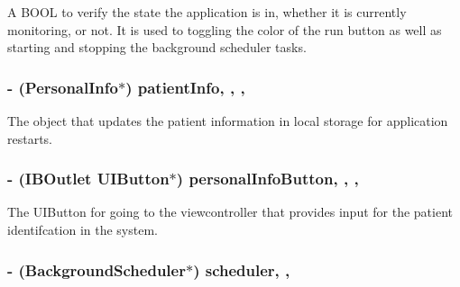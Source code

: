 A B\-O\-O\-L to verify the state the application is in, whether it is currently monitoring, or not. It is used to toggling the color of the run button as well as starting and stopping the background scheduler tasks. \hypertarget{interface_home_screen_v_c_a18a3276c68060f2a0fdd9fbfd32416ab}{
\subsubsection[{patient\-Info}]{\setlength{\rightskip}{0pt plus 5cm}-\/ ({\bf Personal\-Info}$\ast$) patient\-Info\hspace{0.3cm}{\ttfamily [read]}, {\ttfamily [write]}, {\ttfamily [atomic]}, {\ttfamily [retain]}}}\label{interface_home_screen_v_c_a18a3276c68060f2a0fdd9fbfd32416ab}
The object that updates the patient information in local storage for application restarts. \hypertarget{interface_home_screen_v_c_a8324fe604c4a1dae3d45f9b6fb63d80f}{
\subsubsection[{personal\-Info\-Button}]{\setlength{\rightskip}{0pt plus 5cm}-\/ (I\-B\-Outlet U\-I\-Button$\ast$) personal\-Info\-Button\hspace{0.3cm}{\ttfamily [read]}, {\ttfamily [write]}, {\ttfamily [nonatomic]}, {\ttfamily [retain]}}}\label{interface_home_screen_v_c_a8324fe604c4a1dae3d45f9b6fb63d80f}
The U\-I\-Button for going to the viewcontroller that provides input for the patient identifcation in the system. \hypertarget{interface_home_screen_v_c_a9b110975a1b591e149fc83c768312673}{
\subsubsection[{scheduler}]{\setlength{\rightskip}{0pt plus 5cm}-\/ ({\bf Background\-Scheduler}$\ast$) scheduler\hspace{0.3cm}{\ttfamily [read]}, {\ttfamily [write]}, {\ttfamily [atomic]}}}\label{interface_home_screen_v_c_a9b110975a1b591e149fc83c768312673}
